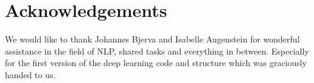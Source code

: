 
\section*{Acknowledgements}
We would like to thank Johannes Bjerva and Isabelle Augenstein for wonderful assistance in the field of NLP, shared tasks and everything in between. Especially for the first version of the deep learning code and structure which was graciously handed to us.